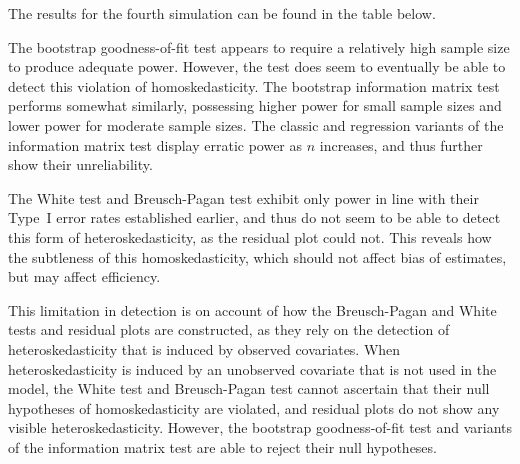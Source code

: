 \documentclass[12pt]{article} %
\theoremstyle{definition}
\begin{document}
The results for the fourth simulation can be found in the table below.

\begin{table}[H]
	\centering
	\small\addtolength{\tabcolsep}{-3pt}
	\setlength\extrarowheight{-3pt}
	{
	}
	\end{table}

The bootstrap goodness-of-fit test appears to require a relatively high sample size to produce adequate power. However, the test does seem to eventually be able to detect this violation of homoskedasticity.
The bootstrap information matrix test performs somewhat similarly, possessing higher power for small sample sizes and lower power for moderate sample sizes. The classic and regression variants of the information
matrix test display erratic power as $n$ increases, and thus further show their unreliability.

The White test and Breusch-Pagan test exhibit only power in line with their Type~I error rates established earlier, and thus do not seem to be able to detect this form of heteroskedasticity,
as the residual plot could not. This reveals how the subtleness of this homoskedasticity, which should not affect bias of estimates, but may affect efficiency.

This limitation in detection is on account of how the Breusch-Pagan and White tests and residual plots are constructed, as they rely on the detection of heteroskedasticity that is induced by observed covariates.
When heteroskedasticity is induced by an unobserved covariate that is not used in the model, the White test and Breusch-Pagan test cannot ascertain that their
null hypotheses of homoskedasticity are violated, and residual plots do not show any visible heteroskedasticity. However, the bootstrap goodness-of-fit test and variants of the information matrix test are able to
reject their null hypotheses.
\end{document}
